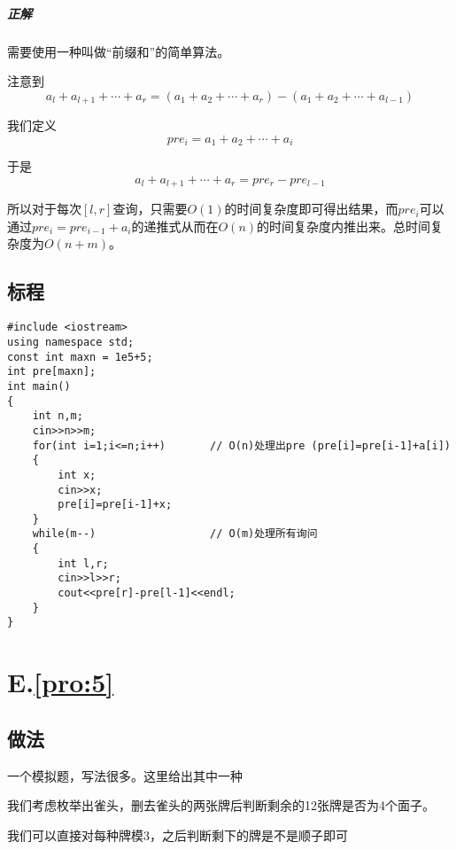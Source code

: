 \documentclass[
	lang=cn,
	color=blue
]{elegantbook}
\begin{document}
\paragraph*{正解} 需要使用一种叫做“前缀和”的简单算法。

注意到$$a_l+a_{l+1}+ \cdots + a_r = (a_1 + a_2 + \cdots + a_r) - (a_1 + a_2 + \cdots + a_{l-1})$$

我们定义$$pre_i = a_1 + a_2 + \cdots + a_i$$

于是$$a_l+a_{l+1}+ \cdots + a_r = pre_r - pre_{l-1}$$

所以对于每次$[l,r]$查询，只需要$O(1)$的时间复杂度即可得出结果，而$pre_i$可以通过$pre_i = pre_{i-1} + a_i$的递推式从而在$O(n)$的时间复杂度内推出来。总时间复杂度为$O(n+m)$。

\section*{标程}
\begin{lstlisting}
#include <iostream>
using namespace std;
const int maxn = 1e5+5;
int pre[maxn];
int main()
{
    int n,m;
    cin>>n>>m;
    for(int i=1;i<=n;i++)       // O(n)处理出pre (pre[i]=pre[i-1]+a[i])
    {
        int x;
        cin>>x;
        pre[i]=pre[i-1]+x;
    }
    while(m--)                  // O(m)处理所有询问
    {
        int l,r;
        cin>>l>>r;
        cout<<pre[r]-pre[l-1]<<endl;
    }
}
\end{lstlisting}

\chapter*{E.\quad \ref*{pro:5}}
\section*{做法}

一个模拟题，写法很多。这里给出其中一种

我们考虑枚举出雀头，删去雀头的两张牌后判断剩余的12张牌是否为4个面子。

我们可以直接对每种牌模3，之后判断剩下的牌是不是顺子即可
\end{document}

